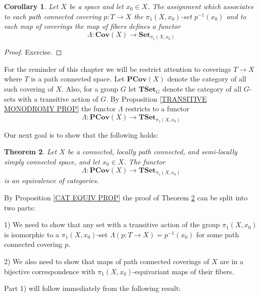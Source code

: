 \documentclass[11pt, letterpaper, oneside]{report}
\theoremstyle{pplain}
\newtheorem{theorem}{Theorem}[chapter]
\newtheorem{corollary}[theorem]{Corollary}
\theoremstyle{ddefinition}
\theoremstyle{nnn}
\theoremstyle{eexercise}
\newcommand{\Set}{{\mathbf{Set}}}
\newcommand{\TSet}{{\mathbf{TSet}}}
\newcommand{\Cov}{{\mathbf{Cov}}}
\newcommand{\PCov}{{\mathbf{PCov}}}
\begin{document}
\begin{corollary}
Let $X$ be a space and let $x_{0}\in X$. The assignment which associates to each path connected 
covering $p\colon T\to X$ the $\pi_{1}(X, x_{0})$-set $p^{-1}(x_{0})$ and to each map of coverings the 
map of fibers defines a functor
$$\Lambda\colon \Cov(X)  \to \Set_{\pi_{1}(X, x_{0})}$$
\end{corollary}

\begin{proof}
Exercise.
\end{proof}

For the reminder of this chapter we will be restrict attention to coverings $T\to X$ where $T$ is 
a path connected space. Let $ \PCov(X) $ denote the category of all such covering of $X$. 
Also, for a group $G$ let $\TSet_{G}$ denote the category of all $G$-sets with a transitive action of 
$G$. By Proposition \ref{TRANSITIVE MONODROMY PROP} the functor $\Lambda$ restricts to 
a functor
$$\Lambda\colon \PCov(X)  \to \TSet_{\pi_{1}(X, x_{0})}$$

Our next goal is to show that the following holds:

\begin{theorem}
\label{PCOV EQ TSET THM}
Let $X$ be a connected, locally path connected, and semi-locally simply connected space, and let 
$x_{0}\in X$.  The functor
$$\Lambda\colon \PCov(X)  \to \TSet_{\pi_{1}(X, x_{0})}$$
is an equivalence of categories. 
\end{theorem}


By Proposition \ref{CAT EQUIV PROP} the proof of Theorem \ref{PCOV EQ TSET THM} can be split into two 
parts:

1) We need to show that  any set with a transitive action of the group $\pi_{1}(X, x_{0})$ is isomorphic
to a $\pi_{1}(X, x_{0})$-set $\Lambda(p\colon T \to X)=p^{-1}(x_{0})$ for some path connected covering $p$. 

2) We also need to show that maps of path connected coverings of $X$ are in a bijective correspondence with 
$\pi_{1}(X, x_{0})$-equivariant maps of their fibers.  

Part 1) will follow immediately from the following  result:
\end{document}

